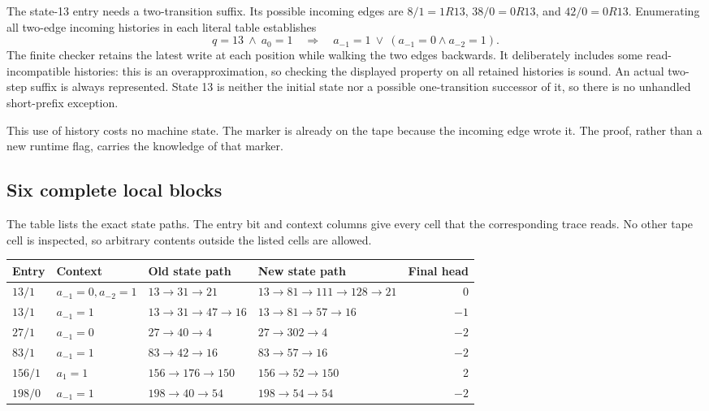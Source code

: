 \documentclass[11pt]{article}
\theoremstyle{definition}
\begin{document}
The state-13 entry needs a two-transition suffix. Its possible incoming
edges are \(8/1=1R13\), \(38/0=0R13\), and \(42/0=0R13\). Enumerating all
two-edge incoming histories in each literal table establishes
\begin{equation}
 q=13\ \land\ a_0=1
 \quad\Longrightarrow\quad
 a_{-1}=1\ \lor\ (a_{-1}=0\land a_{-2}=1).
 \label{eq:history}
\end{equation}
The finite checker retains the latest write at each position while walking
the two edges backwards. It deliberately includes some read-incompatible
histories: this is an overapproximation, so checking the displayed property
on all retained histories is sound. An actual two-step suffix is always
represented. State 13 is neither the initial state nor a possible
one-transition successor of it, so there is no unhandled short-prefix
exception.

This use of history costs no machine state. The marker is already on the
tape because the incoming edge wrote it. The proof, rather than a new
runtime flag, carries the knowledge of that marker.

\subsection{Six complete local blocks}

The table lists the exact state paths. The entry bit and context columns
give every cell that the corresponding trace reads. No other tape cell is
inspected, so arbitrary contents outside the listed cells are allowed.

\begin{center}\small
\begin{tabular}{@{}llp{3.5cm}p{3.8cm}r@{}}
\toprule
Entry & Context & Old state path & New state path & Final head\\
\midrule
\(13/1\)& \(a_{-1}=0,a_{-2}=1\)&
\(13\to31\to21\)&\(13\to81\to111\to128\to21\)&0\\
\(13/1\)& \(a_{-1}=1\)&
\(13\to31\to47\to16\)&\(13\to81\to57\to16\)&\(-1\)\\
\(27/1\)& \(a_{-1}=0\)&
\(27\to40\to4\)&\(27\to302\to4\)&\(-2\)\\
\(83/1\)& \(a_{-1}=1\)&
\(83\to42\to16\)&\(83\to57\to16\)&\(-2\)\\
\(156/1\)& \(a_{1}=1\)&
\(156\to176\to150\)&\(156\to52\to150\)&2\\
\(198/0\)& \(a_{-1}=1\)&
\(198\to40\to54\)&\(198\to54\to54\)&\(-2\)\\
\bottomrule
\end{tabular}
\end{center}
\end{document}
